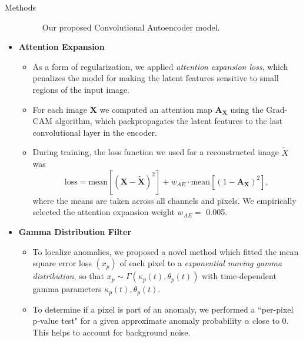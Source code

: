 \documentclass[final,hyperref={pdfpagelabels=false}]{beamer}
\begin{document}
\begin{frame}[t]
\begin{columns}[t]
\begin{column}{.465\textwidth}
\begin{block}{Methods}
\begin{itemize}
\begin{figure}
\caption{Our proposed Convolutional Autoencoder model.}
\end{figure}

\bigskip
\item \textbf{Attention Expansion}

\begin{itemize}
\item As a form of regularization, we applied \textit{attention expansion loss}, which penalizes the model for making the latent features sensitive to small regions of the input image.

\item For each image $\mathbf{X}$ we computed an attention map $\mathbf{A_X}$ using the Grad-CAM algorithm, which packpropagates the latent features to the last convolutional layer in the encoder.

\item During training, the loss function we used for a reconstructed image $\widetilde{X}$ was
$$\text{loss} = \text{mean}[(\mathbf{X} - \widetilde{\mathbf{X}})^2] + w_{AE} \cdot \text{mean}[(1 - \mathbf{A_X})^2],$$
where the means are taken across all channels and pixels. We empirically selected the attention expansion weight $w_{AE} = $ 0.005.\\[6mm]
\end{itemize}

\item\textbf{Gamma Distribution Filter}

\begin{itemize}
\item To localize anomalies, we proposed a novel method which fitted the mean square error loss $(x_p)$ of each pixel to a \textit{exponential moving gamma distribution}, so that $x_p \sim \Gamma(\kappa_p(t), \theta_p(t))$ with time-dependent gamma parameters $\kappa_p(t), \theta_p(t)$.

\item To determine if a pixel is part of an anomaly, we performed a ``per-pixel p-value test" for a given approximate anomaly probability $\alpha$ close to 0. This helps to account for background noise.

\end{itemize}


\end{itemize}
\end{block}
\end{column}
\end{columns}
\end{frame}
\end{document}
